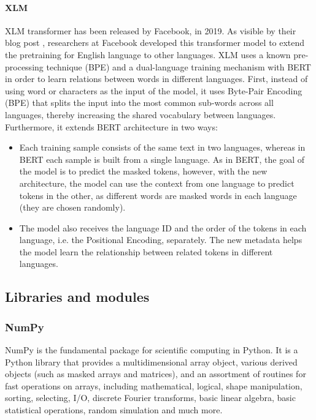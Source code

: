 \documentclass[\main/main.tex]{subfiles}
\begin{document}
\paragraph{XLM}
XLM transformer has been released by Facebook, in 2019. As visible by their blog post \cite{xlm_blog_post}, researchers at Facebook developed this transformer model to extend the pretraining for English language to other languages. XLM uses a known pre-processing technique (BPE) and a dual-language training mechanism with BERT in order to learn relations between words in different languages. First, instead of using word or characters as the input of the model, it uses Byte-Pair Encoding (BPE) that splits the input into the most common sub-words across all languages, thereby increasing the shared vocabulary between languages. Furthermore, it extends BERT architecture in two ways:
\begin{itemize}
    \item Each training sample consists of the same text in two languages, whereas in BERT each sample is built from a single language. As in BERT, the goal of the model is to predict the masked tokens, however, with the new architecture, the model can use the context from one language to predict tokens in the other, as different words are masked words in each language (they are chosen randomly).
    \item The model also receives the language ID and the order of the tokens in each language, i.e. the Positional Encoding, separately. The new metadata helps the model learn the relationship between related tokens in different languages.
\end{itemize}
\cite{DBLP:journals/corr/abs-1901-07291}

\subsection{Libraries and modules}
\subsubsection{NumPy}
NumPy is the fundamental package for scientific computing in Python. It is a Python library that provides a multidimensional array object, various derived objects (such as masked arrays and matrices), and an assortment of routines for fast operations on arrays, including mathematical, logical, shape manipulation, sorting, selecting, I/O, discrete Fourier transforms, basic linear algebra, basic statistical operations, random simulation and much more.\cite{harris2020array}
\end{document}

